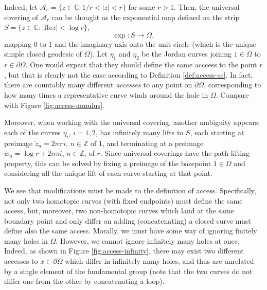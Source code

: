\documentclass[11pt,a4paper,reqno]{amsart}
\theoremstyle{plain}
\theoremstyle{definition}
\theoremstyle{plain}
\def\Cx{\mathbb{C}}
\renewcommand{\tilde}{\widetilde}
\begin{document}
Indeed, let $\mathcal{A}_r = \{z\in\Cx\colon 1/r < |z| < r\}$ for some $r > 1$. Then, the universal covering of $ \mathcal{A}_r  $ can be thought as the exponential map  defined on the strip $S = \{z\in\Cx\colon |\textrm{Re} z| < \log r\}$, \[\exp\colon S\longrightarrow \Omega, \]  mapping $0$ to $1$ and the imaginary axis onto the unit circle (which is the unique simple closed geodesic of $\Omega$). Let $\eta_1$ and $\eta_2$ be the Jordan curves joining $1\in\Omega$ to $r\in\partial\Omega$. One would expect that they should define the same acccess to the point $r$, but that is clearly not the case according to Definition \ref{def:access-sc}. In fact, there are countably many different {\em accesses} to any point on $\partial\Omega$, corresponding to how many times a representative curve winds around the hole in $\Omega$.  Compare with Figure \ref{fig:access-annulus}.

Moreover, when working with the universal covering, another ambiguity appears: each of the curves $\eta_i$, $i=1,2$, has infinitely many lifts to $S$, each starting at preimage $\tilde z_n = 2n\pi i$, $n\in\mathbb{Z}$ of $1$, and terminating at a preimage $\tilde w_n = \log r + 2n\pi i$, $n\in\mathbb{Z}$, of $r$. Since universal coverings have the path-lifting property, this can be solved by fixing a preimage of the basepoint $1\in\Omega$ and considering all the unique lift of each curve starting at that point.

We see that modifications must be made to the definition of access. Specifically, not only two homotopic curves (with fixed endpoints) must define the same access, but, moreover, two non-homotopic curves which land at the same boundary point and only differ on adding (concatenating) a closed curve must define also the same access.  Morally, we must have some way of ignoring finitely many holes in $\Omega$. However, we cannot ignore infinitely many  holes at once. Indeed, as shown in  Figure \ref{fig:access-infinity}, there may exist two different accesses to $x\in\partial \Omega$ which differ in infinitely many holes, and thus are unrelated by a single element of the fundamental group (note that the two curves do not differ one from the other by concatenating a loop). 
\end{document}
